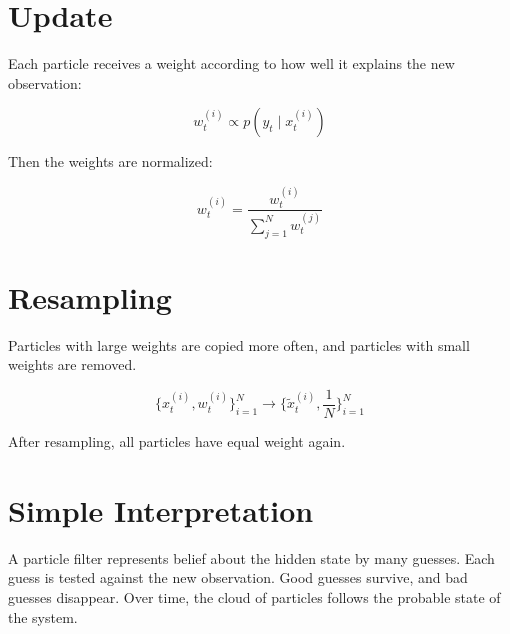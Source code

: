 \documentclass[a4paper]{article}
\begin{document}
    
    \section{Update}
        
        Each particle receives a weight according to how well it explains the new observation:
        
        \begin{equation}
            w_t^{(i)} \propto p(y_t \mid x_t^{(i)})
        \end{equation}
        
        Then the weights are normalized:
        
        \begin{equation}
            w_t^{(i)} =
            \frac{w_t^{(i)}}{\sum_{j=1}^{N} w_t^{(j)}}
        \end{equation}
    
    
    \section{Resampling}
        
        Particles with large weights are copied more often, and particles with small weights are removed.
        
        \begin{equation}
            \{x_t^{(i)}, w_t^{(i)}\}_{i=1}^{N}
            \rightarrow
            \{\tilde{x}_t^{(i)}, \frac{1}{N}\}_{i=1}^{N}
        \end{equation}
        
        After resampling, all particles have equal weight again.
    
    
    \section{Simple Interpretation}
        
        A particle filter represents belief about the hidden state by many guesses.
        Each guess is tested against the new observation.
        Good guesses survive, and bad guesses disappear.
        Over time, the cloud of particles follows the probable state of the system.
        
        
        
\end{document}
